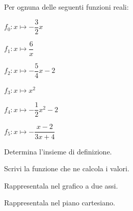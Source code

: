 \begin{esercizio}\label{ese:03.1}
Per ognuna delle seguenti funzioni reali:
\vspace{-3mm}
\begin{multicols}{3}
\begin{enumeratea}
\item \(f_0: x \mapsto - \dfrac{3}{2} x\)
\item \(f_1: x \mapsto \dfrac{6}{x}\)
\item \(f_2: x \mapsto - \dfrac{5}{4} x -2\)
\item \(f_3: x \mapsto x^2\)
\item \(f_4: x \mapsto - \dfrac{1}{2} x^2 -2\)
\item \(f_5: x \mapsto - \dfrac{x-2}{3x+4}\)
\end{enumeratea}
\end{multicols}
\begin{multicols}{2}
\begin{enumeratea}
\item Determina l'insieme di definizione.
\item Scrivi la funzione che ne calcola i valori.
\item Rappresentala nel grafico a due assi.
\item Rappresentala nel piano cartesiano.
\end{enumeratea}
\end{multicols}
\end{esercizio}


